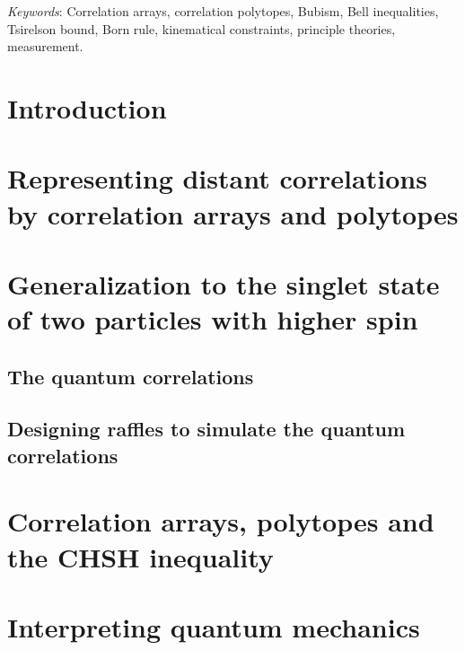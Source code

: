 \documentclass[12pt]{article}
\numberwithin{equation}{section}
\begin{document}
\noindent
\emph{Keywords}: Correlation arrays, correlation polytopes, Bubism, Bell inequalities, Tsirelson bound, Born rule, kinematical constraints, principle theories, measurement.

\newpage
\tableofcontents
\newpage

\section{Introduction}\label{0}


\section{Representing distant correlations by correlation arrays and polytopes} \label{1}




\section{Generalization to the singlet state of two particles with higher spin} \label{2}


\subsection{The quantum correlations} \label{2.1}


\subsection{Designing raffles to simulate the quantum correlations} \label{2.2}



\section{Correlation arrays, polytopes and the CHSH inequality} \label{3}


\section{Interpreting quantum mechanics} \label{4}

\end{document}
